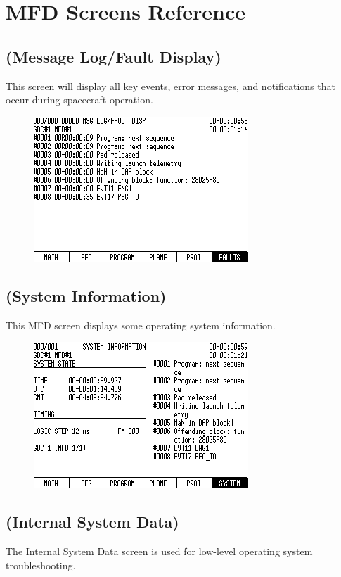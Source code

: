 \section{MFD Screens Reference}
\subsection{ (Message Log/Fault Display)}
This screen will display all key events, error messages, and notifications that occur during spacecraft operation.

\begin{figure}[htb]
\centering
\includegraphics[bb=0 0 9cm 7cm,scale=0.50]{../graphics/rv550_screen3.png}
\end{figure}

\subsection{ (System Information)}
This MFD screen displays some operating system information.

\begin{figure}[htb]
\centering
\includegraphics[bb=0 0 9cm 7cm,scale=0.50]{../graphics/rv550_screen4.png}
\end{figure}

\subsection{ (Internal System Data)}
The Internal System Data screen is used for low-level operating system troubleshooting.

